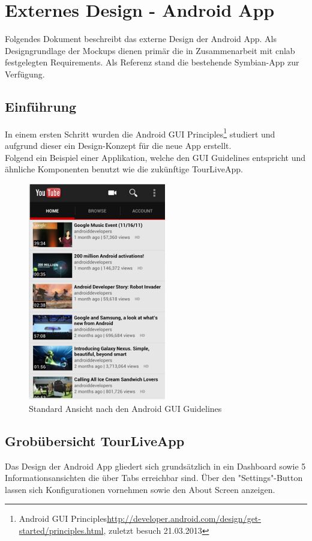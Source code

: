 \section{Externes Design - Android App}
\label{sec:externesdesignandroid}
Folgendes Dokument beschreibt das externe Design der Android App. Als Designgrundlage der Mockups dienen primär die in Zusammenarbeit mit cnlab festgelegten Requirements. Als Referenz stand die bestehende Symbian-App zur Verfügung. 

\subsection{Einführung}
In einem ersten Schritt wurden die Android GUI Principles\footnote{Android GUI Principles\url{http://developer.android.com/design/get-started/principles.html}, zuletzt besuch 21.03.2013}  studiert und aufgrund dieser ein Design-Konzept für die neue App erstellt.
\\

Folgend ein Beispiel einer Applikation, welche den GUI Guidelines entspricht und ähnliche Komponenten benutzt wie die zukünftige TourLiveApp.

\begin{figure}[H]
	\centering\includegraphics[width=60mm]{images/android/mockups/androidexample.png} 
	\caption{Standard Ansicht nach den Android GUI Guidelines}
\end{figure}

\subsection{Grobübersicht TourLiveApp}
Das Design der Android App gliedert sich grundsätzlich in ein Dashboard sowie 5 Informationsansichten die über Tabs erreichbar sind. Über den "Settings"-Button lassen sich Konfigurationen vornehmen sowie den About Screen anzeigen.

